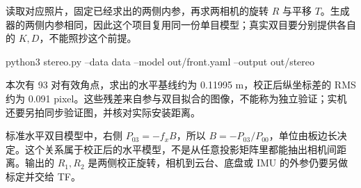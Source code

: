 \begin{example}[先在模拟图中找回 12 cm 基线]
 读取对应照片，固定已经求出的两侧内参，再求两相机的旋转 $R$ 与平移 $T$。生成器的两侧内参相同，因此这个项目复用同一份单目模型；真实双目要分别提供各自的 $K,D$，不能照抄这个前提。

\begin{tbash}
python3 stereo.py --data data --model out/front.yaml --output out/stereo
\end{tbash}
本次有 93 对有效角点，求出的水平基线约为 0.11995 m，校正后纵坐标差的 RMS 约为 0.091 pixel。这些残差来自参与双目拟合的图像，不能称为独立验证；实机还要另拍同步验证图，并核对实际安装距离。

标准水平双目模型中，右侧 $P_{03}=-f_xB$，所以 $B=-P_{03}/P_{00}$，单位由板边长决定。这个关系属于校正后的水平模型，不是从任意投影矩阵里都能抽出相机间距离。输出的 $R_1,R_2$ 是两侧校正旋转，相机到云台、底盘或 IMU 的外参仍要另做标定并交给 TF。
\end{example}

